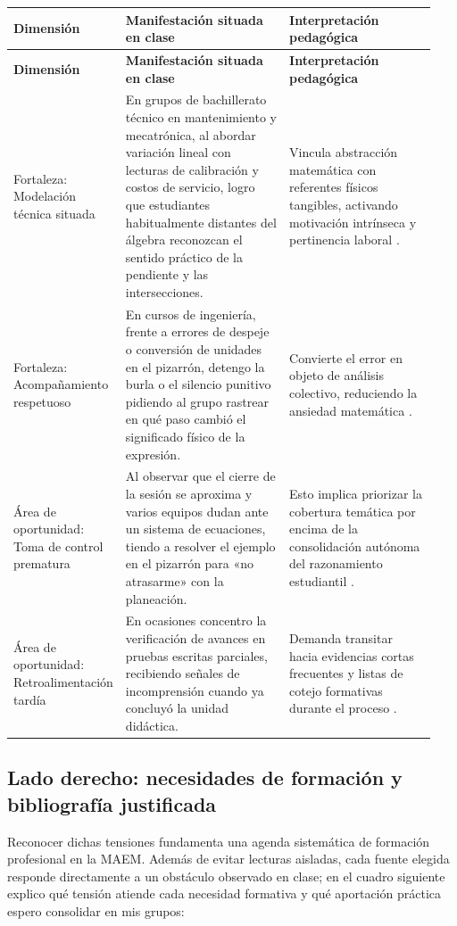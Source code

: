 \documentclass[spanish,letterpaper,oneside]{article}
\begin{document}
{\small{}\renewcommand{\arraystretch}{1.35}
\begin{longtable}{|>{\raggedright\arraybackslash}p{0.20\linewidth}|>{\raggedright\arraybackslash}p{0.39\linewidth}|>{\raggedright\arraybackslash}p{0.35\linewidth}|}\hline
\rowcolor{iiiepePale} \textbf{Dimensión} & \textbf{Manifestación situada en clase} & \textbf{Interpretación pedagógica} \\\hline
\endfirsthead
\hline
\rowcolor{iiiepePale} \textbf{Dimensión} & \textbf{Manifestación situada en clase} & \textbf{Interpretación pedagógica} \\\hline
\endhead
Fortaleza: Modelación técnica situada & En grupos de bachillerato técnico en mantenimiento y mecatrónica, al abordar variación lineal con lecturas de calibración y costos de servicio, logro que estudiantes habitualmente distantes del álgebra reconozcan el sentido práctico de la pendiente y las intersecciones. & Vincula abstracción matemática con referentes físicos tangibles, activando motivación intrínseca y pertinencia laboral \citep{star2015algebra}. \\\hline
Fortaleza: Acompañamiento respetuoso & En cursos de ingeniería, frente a errores de despeje o conversión de unidades en el pizarrón, detengo la burla o el silencio punitivo pidiendo al grupo rastrear en qué paso cambió el significado físico de la expresión. & Convierte el error en objeto de análisis colectivo, reduciendo la ansiedad matemática \citep{schunk2012teorias}. \\\hline
Área de oportunidad: Toma de control prematura & Al observar que el cierre de la sesión se aproxima y varios equipos dudan ante un sistema de ecuaciones, tiendo a resolver el ejemplo en el pizarrón para «no atrasarme» con la planeación. & Esto implica priorizar la cobertura temática por encima de la consolidación autónoma del razonamiento estudiantil \citep{sawyer2008optimizing}. \\\hline
Área de oportunidad: Retroalimentación tardía & En ocasiones concentro la verificación de avances en pruebas escritas parciales, recibiendo señales de incomprensión cuando ya concluyó la unidad didáctica. & Demanda transitar hacia evidencias cortas frecuentes y listas de cotejo formativas durante el proceso \citep{eef2021feedback}. \\\hline
\end{longtable}}

\subsection*{Lado derecho: necesidades de formación y bibliografía justificada}
Reconocer dichas tensiones fundamenta una agenda sistemática de formación profesional en la MAEM. Además de evitar lecturas aisladas, cada fuente elegida responde directamente a un obstáculo observado en clase; en el cuadro siguiente explico qué tensión atiende cada necesidad formativa y qué aportación práctica espero consolidar en mis grupos:
\end{document}
